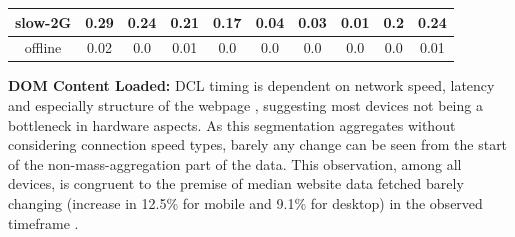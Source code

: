 \begin{table}[!t]
{\begin{tabular}{|c|ccccccccc|}
slow-2G & \multicolumn{1}{c|}{0.29} & \multicolumn{1}{c|}{0.24} & \multicolumn{1}{c|}{0.21} & \multicolumn{1}{c|}{0.17} & \multicolumn{1}{c|}{0.04} & \multicolumn{1}{c|}{0.03} & \multicolumn{1}{c|}{0.01} & \multicolumn{1}{c|}{0.2} & 0.24 \\ \hline
offline & \multicolumn{1}{c|}{0.02} & \multicolumn{1}{c|}{0.0} & \multicolumn{1}{c|}{0.01} & \multicolumn{1}{c|}{0.0} & \multicolumn{1}{c|}{0.0} & \multicolumn{1}{c|}{0.0} & \multicolumn{1}{c|}{0.0} & \multicolumn{1}{c|}{0.0} & 0.01 \\ \hline
\end{tabular}%
}
\end{table}


\noindent\textbf{DOM Content Loaded:}
DCL  timing is dependent on network speed, latency and especially structure of the webpage%
, suggesting most devices not being a bottleneck in hardware aspects. As this segmentation aggregates without considering connection speed types, barely any change can be seen from the start of the non-mass-aggregation part of the data.
This observation, among all devices, is congruent to the premise of median website data fetched barely changing (increase in 12.5\% for mobile and 9.1\% for desktop) in the observed timeframe \cite{HTMLarchive}.

